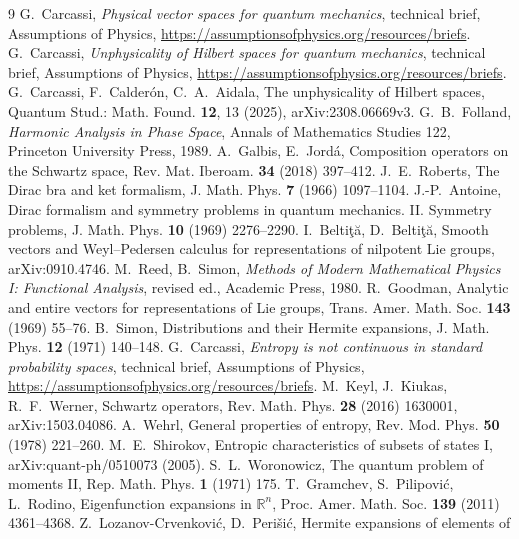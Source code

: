 \documentclass[11pt]{article}
\theoremstyle{definition}
\begin{document}
\begin{thebibliography}{9}
 G.~Carcassi, \emph{Physical vector spaces for quantum mechanics}, technical
  brief, Assumptions of Physics, \url{https://assumptionsofphysics.org/resources/briefs}.
 G.~Carcassi, \emph{Unphysicality of Hilbert spaces for quantum mechanics},
  technical brief, Assumptions of Physics,
  \url{https://assumptionsofphysics.org/resources/briefs}.
 G.~Carcassi, F.~Calder\'on, C.~A.~Aidala, The unphysicality of Hilbert spaces,
  Quantum Stud.: Math. Found. \textbf{12}, 13 (2025), arXiv:2308.06669v3.
 G.~B.~Folland, \emph{Harmonic Analysis in Phase Space}, Annals of Mathematics
  Studies 122, Princeton University Press, 1989.
 A.~Galbis, E.~Jord\'a, Composition operators on the Schwartz space, Rev. Mat.
  Iberoam. \textbf{34} (2018) 397--412.
 J.~E.~Roberts, The Dirac bra and ket formalism, J. Math. Phys. \textbf{7}
  (1966) 1097--1104.
 J.-P.~Antoine, Dirac formalism and symmetry problems in quantum mechanics.
  II. Symmetry problems, J. Math. Phys. \textbf{10} (1969) 2276--2290.
 I.~Belti\c{t}\u{a}, D.~Belti\c{t}\u{a}, Smooth vectors and Weyl--Pedersen calculus
  for representations of nilpotent Lie groups, arXiv:0910.4746.
 M.~Reed, B.~Simon, \emph{Methods of Modern Mathematical Physics I: Functional
  Analysis}, revised ed., Academic Press, 1980.
 R.~Goodman, Analytic and entire vectors for representations of Lie groups,
  Trans. Amer. Math. Soc. \textbf{143} (1969) 55--76.
 B.~Simon, Distributions and their Hermite expansions, J. Math. Phys.
  \textbf{12} (1971) 140--148.
 G.~Carcassi, \emph{Entropy is not continuous in standard probability spaces},
  technical brief, Assumptions of Physics,
  \url{https://assumptionsofphysics.org/resources/briefs}.
 M.~Keyl, J.~Kiukas, R.~F.~Werner, Schwartz operators, Rev. Math. Phys.
  \textbf{28} (2016) 1630001, arXiv:1503.04086.
 A.~Wehrl, General properties of entropy, Rev. Mod. Phys. \textbf{50} (1978)
  221--260.
 M.~E.~Shirokov, Entropic characteristics of subsets of states I,
  arXiv:quant-ph/0510073 (2005).
 S.~L.~Woronowicz, The quantum problem of moments II, Rep. Math. Phys.
  \textbf{1} (1971) 175.
 T.~Gramchev, S.~Pilipovi\'c, L.~Rodino, Eigenfunction expansions in
  $\mathbb R^n$, Proc. Amer. Math. Soc. \textbf{139} (2011) 4361--4368.
 Z.~Lozanov-Crvenkovi\'c, D.~Peri\v{s}i\'c, Hermite expansions of elements of

\end{thebibliography}
\end{document}
